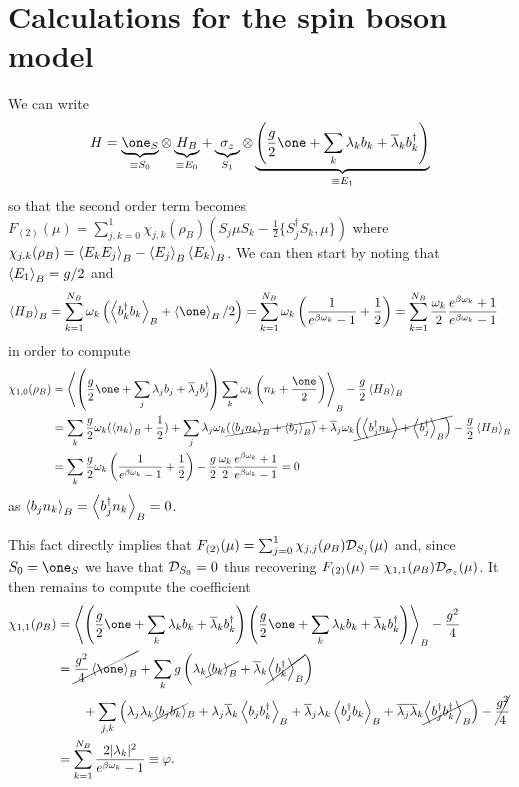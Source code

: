 \section{Calculations for the spin boson model}
\label{sec:spin_boson_model_calculations}
We can write  
\[H = \underbrace{\one_S}_{\equiv S_0} \otimes \underbrace{H_B}_{\equiv E_0} + \underbrace{\sigma_z}_{S_1} \otimes \underbrace{\left(\frac{g}{2}\one + \sum_k \lambda_k b_k + \overline{\lambda}_k b_k^\dag\right)}_{\equiv E_1}\]
so that the second order term becomes $F_{(2)}(\mu) = \sum_{j,k=0}^1 \chi_{j,k}(\rho_B) \left(S_j\mu S_k - \frac{1}{2}\{S_j^\dag S_k, \mu\}\right)$
where $\chi_{j,k}(\rho_B) = \left< E_k E_j \right>_B - \left< E_j \right>_B \left< E_k \right>_B$. 
We can then start by noting that \(\left< E_1 \right>_B = g/2\) and 
\begin{align*}
    \expect{H_B}_B &= \sum_{k=1}^{N_B} \omega_k \left( \expect{b_k^\dag b_k}_B + \expect{\one}_B/2\right)= \sum_{k=1}^{N_B} \omega_k \left( \frac{1}{e^{\beta \omega_k}-1} + \frac{1}{2}\right) 
    = \sum_{k=1}^{N_B} \frac{\omega_k}{2} \frac{ e^{\beta \omega_k}+1}{e^{\beta \omega_k}-1}
\end{align*} 
in order to compute
\begin{align*}
    \chi_{1,0}(\rho_B) &= \expect{\left(\frac{g}{2}\one + \sum_j\lambda_j b_j + \overline{\lambda}_jb_j^\dag\right)\sum_k\omega_k\left(n_k+\frac{\one}{2}\right)}_B - \frac{g}{2} \expect{H_B}_B\\
    &= \sum_k \frac{g}{2}\omega_k (\expect{n_k}_B + \um) +\sum_{j}\lambda_j\omega_k \cancel{(\expect{b_jn_k}_B +\expect{b_j}_B)} + \overline{\lambda}_j\omega_k\cancel{\left(\expect{b_j^\dag n_k} + \expect{b_j^\dag}_B\right)} - \frac{g}{2} \expect{H_B}_B\\
    & = \sum_k \frac{g}{2}\omega_k \left(\frac{1}{e^{\beta \omega_k}-1} + \um\right) - \frac{g}{2} \frac{\omega_k}{2} \frac{ e^{\beta \omega_k}+1}{e^{\beta \omega_k}-1} = 0
\end{align*}
as $\left< b_jn_k \right>_B = \left< b_j^\dag n_k \right>_B =0$.

This fact directly implies that $F_{(2)}(\mu) = \sum_{j=0}^1 \chi_{j,j}(\rho_B)\mathcal{D}_{S_j}(\mu)$ and, since $S_0=\one_S$ we have that $\mathcal{D}_{S_0} = 0$ thus recovering $F_{(2)}(\mu) = \chi_{1,1}(\rho_B)\mathcal{D}_{\sigma_z}(\mu)$. It then remains to compute the coefficient
\begin{align*}
    \chi_{1,1}(\rho_B) &= \expect{\left(\frac{g}{2}\one + \sum_k \lambda_k b_k + \overline{\lambda}_k b_k^\dag\right)\left(\frac{g}{2}\one + \sum_k \lambda_k b_k + \overline{\lambda}_k b_k^\dag\right)}_B - \frac{g^2}{4}\\
    &= \cancel{\frac{g^2}{4}\expect{\one}_B} + \sum_k g\left(\lambda_k \cancel{\expect{b_k}_B} + \overline{\lambda}_k \cancel{\expect{b_k^\dag}_B}\right) \\&\qquad +\sum_{j,k} \left(\lambda_j\lambda_k \cancel{\expect{b_jb_k}}_B + \lambda_j\overline{\lambda}_k \expect{b_jb_k^\dag}_B + \overline{\lambda}_j\lambda_k \expect{b_j^\dag b_k}_B + \overline{\lambda_j}\overline{\lambda}_k \cancel{\expect{b_j^\dag b_k^\dag}_B}\right)  - \cancel{\frac{g^2}{4}}\\
    &= \sum_{k=1}^{N_B} \frac{2|\lambda_k|^2}{e^{\beta \omega_k}-1} \equiv \varphi.
\end{align*}
